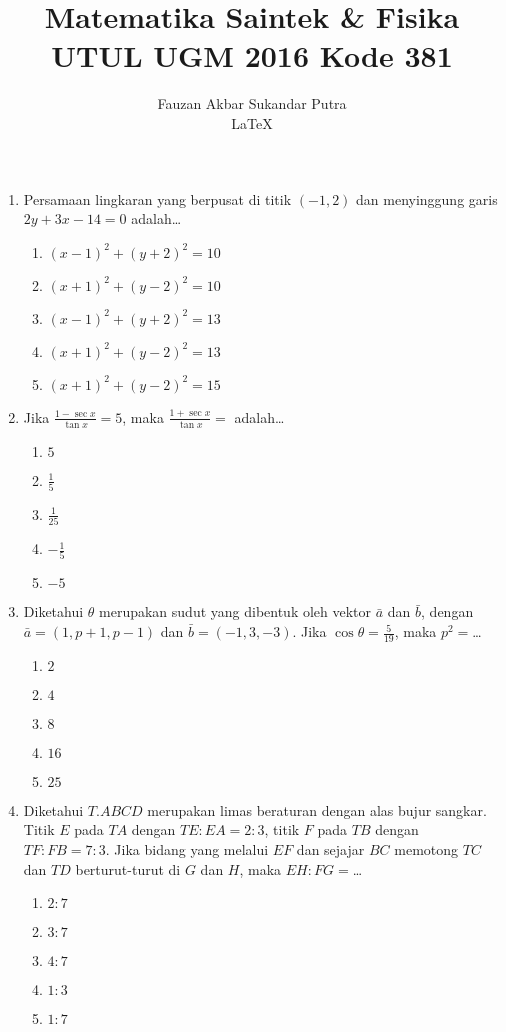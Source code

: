 \documentclass[A4,12PT, english, twocolumn]{journal}
\title{Matematika Saintek \& Fisika UTUL UGM 2016 Kode 381}
\author{Fauzan Akbar Sukandar Putra \\ \LaTeX}
\begin{document}
\maketitle

\begin{enumerate}


\item Persamaan lingkaran yang berpusat di titik $(-1,2)$ dan menyinggung garis $2y+3x-14=0$ adalah\dots
    \begin{enumerate}
        \item $(x-1)^2+(y+2)^2=10$
        \item $(x+1)^2+(y-2)^2=10$
        \item $(x-1)^2+(y+2)^2=13$
        \item $(x+1)^2+(y-2)^2=13$
        \item $(x+1)^2+(y-2)^2=15$
    \end{enumerate}

\item Jika $\frac{1-\sec{x}}{\tan{x}}=5$, maka $\frac{1+\sec{x}}{\tan{x}}=$ adalah\dots
    \begin{enumerate}
        \item $5$
        \item $\frac{1}{5}$
        \item $\frac{1}{25}$
        \item $-\frac{1}{5}$
        \item $-5$
    \end{enumerate}

\item Diketahui $\theta$ merupakan sudut yang dibentuk oleh vektor $\bar{a}$ dan $\bar{b}$, dengan $\bar{a}=(1,p+1,p-1)$ dan $\bar{b}=(-1,3,-3)$. Jika $\cos{\theta}=\frac{5}{19}$, maka $p^2=$\dots
    \begin{enumerate}
        \item $2$
        \item $4$
        \item $8$
        \item $16$
        \item $25$
    \end{enumerate}

\item Diketahui $T.ABCD$ merupakan limas beraturan dengan alas bujur sangkar. Titik $E$ pada $TA$ dengan $TE:EA=2:3$, titik $F$ pada $TB$ dengan $TF:FB=7:3$. Jika bidang yang melalui $EF$ dan sejajar $BC$ memotong $TC$ dan $TD$ berturut-turut di $G$ dan $H$, maka $EH:FG=$\dots
    \begin{enumerate}
        \item $2:7$
        \item $3:7$
        \item $4:7$
        \item $1:3$
        \item $1:7$
    \end{enumerate}


\end{enumerate}
\end{document}

